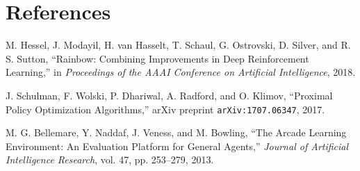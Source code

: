 \documentclass{article}
\begin{document}
\section*{References}
\begin{thebibliography}{9}

M. Hessel, J. Modayil, H. van Hasselt, T. Schaul, G. Ostrovski, D. Silver, and R. S. Sutton, 
``Rainbow: Combining Improvements in Deep Reinforcement Learning,'' 
in \emph{Proceedings of the AAAI Conference on Artificial Intelligence}, 2018.

J. Schulman, F. Wolski, P. Dhariwal, A. Radford, and O. Klimov, 
``Proximal Policy Optimization Algorithms,'' 
arXiv preprint \texttt{arXiv:1707.06347}, 2017.

M. G. Bellemare, Y. Naddaf, J. Veness, and M. Bowling, 
``The Arcade Learning Environment: An Evaluation Platform for General Agents,'' 
\emph{Journal of Artificial Intelligence Research}, vol. 47, pp. 253–279, 2013.

\end{thebibliography}
\end{document}
